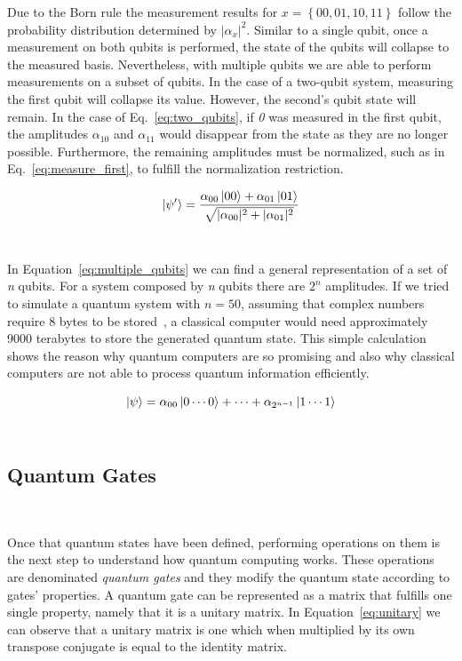 Due to the Born rule the measurement results for
\(x = \left\{00, 01, 10, 11\right\}\) follow the probability
distribution determined by \(|\alpha_{x}|^2\). Similar to a
single qubit, once a measurement on both qubits is performed,
the state of the qubits will collapse to the measured
basis. Nevertheless, with multiple qubits we are able to perform
measurements on a subset of qubits. In the case of a two-qubit
system, measuring the first qubit will collapse its value. However,
the second's qubit state will remain. In the case of Eq.~\ref{eq:two_qubits},
if \textit{0} was measured in the first qubit, the amplitudes \(\alpha_{10}\)
and \(\alpha_{11}\) would disappear from the state as they are no longer
possible. Furthermore, the remaining amplitudes must be normalized,
such as in Eq.~\ref{eq:measure_first}, to fulfill the normalization
restriction.  \

\begin{equation}\label{eq:measure_first}
  \ket{\psi'} = \frac{\alpha_{00}\ket{00} + \alpha_{01}\ket{01}}
                    {\sqrt{|\alpha_{00}|^2 + |\alpha_{01}|^2}}
\end{equation} \

In Equation~\ref*{eq:multiple_qubits} we can find a general representation of
a set of \textit{n} qubits. For a system composed by \textit{n} qubits there are \(2^n\)
amplitudes. If we tried to simulate a quantum system with \(n = 50\), assuming
that complex numbers require 8 bytes to be stored~\cite{harris_array_2020}, a classical computer would need
approximately 9000 terabytes to store the generated quantum state. This simple calculation
shows the reason why quantum computers are so promising and also why classical computers
are not able to process quantum information efficiently. \

\begin{equation}\label{eq:multiple_qubits}
  \ket{\psi} = \alpha_{00}\ket{0\cdots0} + \cdots + \alpha_{2^{n-1}}\ket{1\cdots1}
\end{equation} \

\subsection{Quantum Gates}\label{subsection:gates}\

Once that quantum states have been defined, performing operations
on them is the next step to understand how quantum computing works.
These operations are denominated \textit{quantum gates} and they
modify the quantum state according to gates' properties. A quantum gate
can be represented as a matrix that fulfills one single property,
namely that it is a unitary matrix. In Equation~\ref{eq:unitary} we
can observe that a unitary matrix is one which when multiplied by its
own transpose conjugate is equal to the identity matrix.

